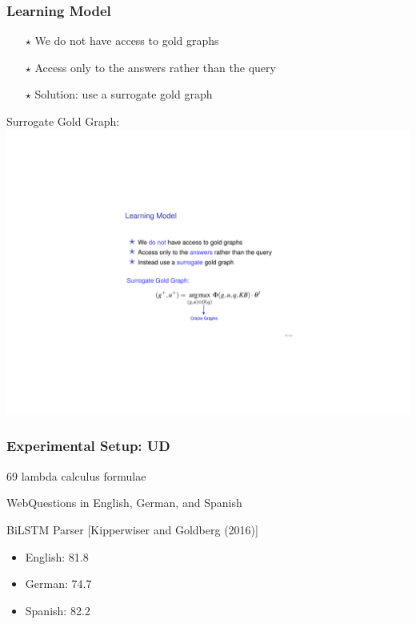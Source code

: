 \documentclass[mathserif,12pt]{beamer}
\newcommand{\hlight}[1]{{\color{blue!80} #1}}
\begin{document}
\begin{frame}
\frametitle{Learning Model}
\large 

\begin{itemize}
 \item[\huge $\star$] We \hlight{do not} have access to gold graphs
 \item[\huge $\star$] Access only to the \hlight{answers} rather than the query
 \item[\huge $\star$] Solution: use a \hlight{surrogate} gold graph
\end{itemize}


\pause
\vspace{0.5cm}
\hlight{Surrogate Gold Graph: }
\includegraphics{figures/perceptron-oracle}

\end{frame}

\begin{frame}
\frametitle{Experimental Setup: UD}
\large
69 lambda calculus formulae

\vspace{2em}
WebQuestions in English, German, and Spanish

\vspace{2em}
BiLSTM Parser {\small [Kipperwiser and Goldberg (2016)]}\\
\begin{itemize}
\item English: 81.8 \\
\item German: 74.7 \\
\item Spanish: 82.2 \\
\end{itemize}
\end{frame}
\end{document}
